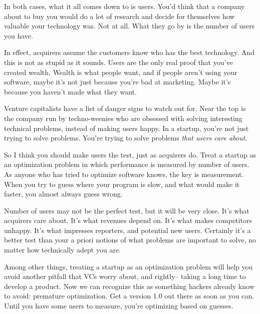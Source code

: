 In
                    both cases, what it all comes down to is users. You'd think
                    that a company about to buy you would do a lot of research
                    and decide for themselves how valuable your technology was.
                    Not at all. What they go by is the number of users you
                    have.

In effect, acquirers assume the customers
                    know who has the best technology. And this is not as stupid
                    as it sounds. Users are the only real proof that you've
                    created wealth. Wealth is what people want, and if people
                    aren't using your software, maybe it's not just because
                    you're bad at marketing. Maybe it's because you haven't made
                    what they want.

Venture capitalists have a list
                    of danger signs to watch out for. Near the top is the
                    company run by techno-weenies who are obsessed with solving
                    interesting technical problems, instead of making users
                    happy. In a startup, you're not just trying to solve
                    problems. You're trying to solve problems
                    \emph{that users care about.}

So I think you
                    should make users the test, just as acquirers do. Treat a
                    startup as an optimization problem in which performance is
                    measured by number of users. As anyone who has tried to
                    optimize software knows, the key is measurement. When you
                    try to guess where your program is slow, and what would make
                    it faster, you almost always guess wrong.

Number
                    of users may not be the perfect test, but it will be very
                    close. It's what acquirers care about. It's what revenues
                    depend on. It's what makes competitors unhappy. It's what
                    impresses reporters, and potential new users. Certainly it's
                    a better test than your a priori notions of what problems
                    are important to solve, no matter how technically adept you
                    are.

Among other things, treating a startup as an
                    optimization problem will help you avoid another pitfall
                    that VCs worry about, and rightly-- taking a long time to
                    develop a product. Now we can recognize this as something
                    hackers already know to avoid: premature optimization. Get a
                    version 1.0 out there as soon as you can. Until you have
                    some users to measure, you're optimizing based on
                    guesses.

